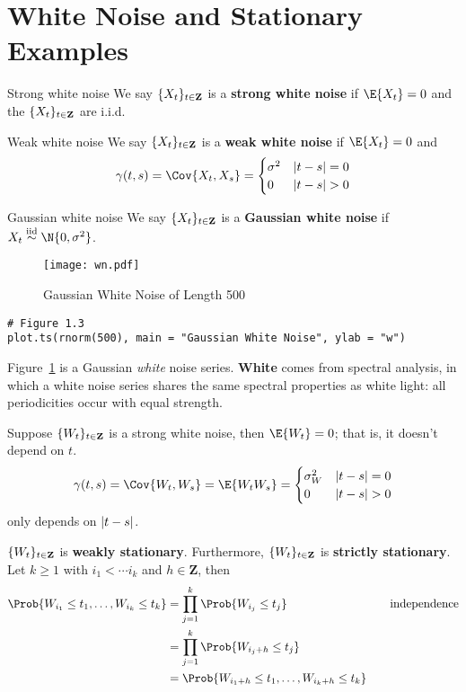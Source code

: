 \section{White Noise and Stationary Examples}
\begin{Definition}{Strong white noise}{}
    We say $ \{X_t\}_{t\in\mathbf{Z}} $ is a
    \textbf{strong white noise} if $ \E{X_t}=0 $
    and the $ \{X_t\}_{t\in\mathbf{Z}} $ are i.i.d.
\end{Definition}
\begin{Definition}{Weak white noise}{}
    We say $ \{X_t\}_{t\in\mathbf{Z}} $ is a
    \textbf{weak white noise} if $ \E{X_t}=0 $
    and
    \[ \gamma(t,s)=\Cov{X_t,X_s}=\begin{cases}
            \sigma^2 & \abs{t-s}=0 \\
            0        & \abs{t-s}>0
        \end{cases} \]
\end{Definition}
\begin{Definition}{Gaussian white noise}{}
    We say $ \{X_t\}_{t\in\mathbf{Z}} $ is a
    \textbf{Gaussian white noise}
    if $ X_t\stackrel{\text{iid}}{\sim}\N{0,\sigma^2} $.
\end{Definition}
\begin{figure}[!ht]
    \centering
    \texttt{[image: wn.pdf]}
    \caption{Gaussian White Noise of Length 500}\label{fig:wn}
\end{figure}
\begin{verbatim}
# Figure 1.3
plot.ts(rnorm(500), main = "Gaussian White Noise", ylab = "w")
\end{verbatim}
Figure~\ref{fig:wn} is a Gaussian \emph{white} noise series.
\textbf{White} comes from spectral analysis,
in which a white noise series shares the same spectral properties as white light:
all periodicities occur with equal strength.
\begin{Example}{}{}
    Suppose $ \{W_t\}_{t\in\mathbf{Z}} $
    is a strong white noise, then $ \E{W_t}=0 $;
    that is, it doesn't depend on $ t $.
    \[ \gamma(t,s)=\Cov{W_t,W_s}=\E{W_t W_s}=
        \begin{cases}
            \sigma_W^2 & \abs{t-s}=0 \\
            0          & \abs{t-s}>0
        \end{cases} \]
    only depends on $ \lvert t-s\rvert $.

    $ \{W_t\}_{t\in\mathbf{Z}} $ is
    \textbf{weakly stationary}. Furthermore,
    $ \{W_t\}_{t\in\mathbf{Z}} $ is
    \textbf{strictly stationary}. Let $ k\ge 1 $
    with $ i_1<\cdots i_k $ and $ h\in\mathbf{Z} $, then
    \begin{align*}
        \Prob{W_{i_1}\le t_1,\ldots,W_{i_k}\le t_k}
         & =\prod_{j=1}^k\Prob{W_{i_j}\le t_j}                   & \quad & \text{independence} \\
         & =\prod_{j=1}^k\Prob{W_{{i_j}+h}\le t_j}                                             \\
         & =\Prob{W_{{i_1}+h}\le t_1,\ldots, W_{{i_k}+h}\le t_k}
    \end{align*}
\end{Example}
